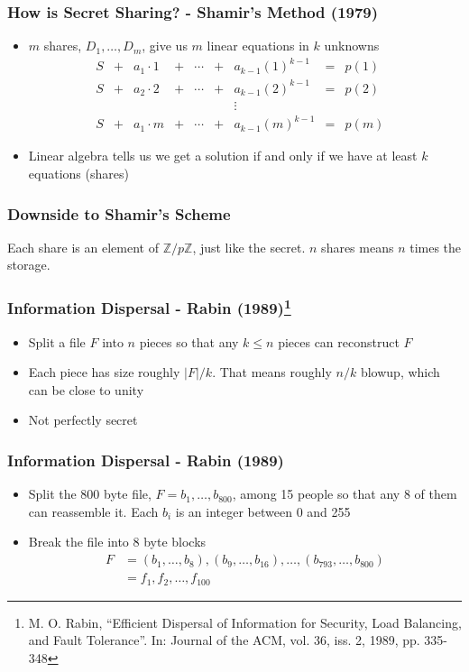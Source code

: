 \documentclass{beamer}
\newcommand{\integers}{\mathbb{Z}}
\begin{document}
\begin{frame}
	\frametitle{How is Secret Sharing? - Shamir's Method (1979)}
	\begin{itemize}
		\item $m$ shares, $D_1,\ldots, D_m$, give us $m$ linear equations in $k$ unknowns\pause
		\[
			\begin{array}{ccccccccccc}
				S & + & a_1\cdot 1  &+& \cdots& + & a_{k-1}(1)^{k-1} & = & p(1)\\
				S & + & a_2\cdot 2  &+& \cdots& + & a_{k-1}(2)^{k-1} & = & p(2)\\
				&&&&&&\vdots&&&\\
				S & + & a_1\cdot m &+& \cdots& + & a_{k-1}(m)^{k-1} & = & p(m)
			\end{array}
		\]
		\item Linear algebra tells us we get a solution if and only if we have at least $k$ equations (shares)
	\end{itemize}
\end{frame}

\begin{frame}
	\frametitle{Downside to Shamir's Scheme}
	Each share is an element of $\integers/p\integers$, just like the secret. $n$ shares means $n$ times the storage.
\end{frame}

\begin{frame}
	\frametitle{Information Dispersal - Rabin (1989)\footnote{M. O. Rabin, ``Efficient Dispersal of Information for Security, Load Balancing, and Fault Tolerance''. In: Journal of the ACM, vol. 36, iss. 2, 1989, pp. 335-348}}
	
	\begin{itemize}
		\item Split a file $F$ into $n$ pieces so that any $k\leq n$ pieces can reconstruct $F$\pause
		\item Each piece has size roughly $|F|/k$. That means roughly $n/k$ blowup, which can be close to unity\pause
		\item Not perfectly secret
	\end{itemize}	
\end{frame}

\begin{frame}
	\frametitle{Information Dispersal - Rabin (1989)}

	\begin{itemize}
		\item Split the 800 byte file, $F = b_1, \ldots, b_{800}$, among 15 people so that any 8 of them can reassemble it. Each $b_i$ is an integer between 0 and 255\pause
		\item Break the file into 8 byte blocks
		\begin{align*}
		F &= (b_1, \ldots, b_8), (b_9, \ldots, b_{16}), \ldots, (b_{793}, \ldots, b_{800})\\
		&= f_1, f_2, \ldots, f_{100}
		\end{align*}\pause
	\end{itemize}

\end{frame}
\end{document}
